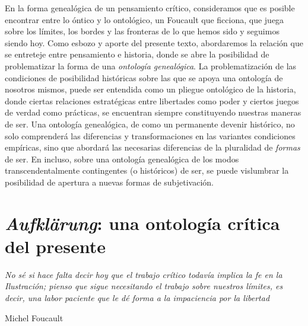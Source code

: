 En la forma genealógica de un pensamiento crítico, consideramos que es posible encontrar entre lo óntico y lo ontológico, un Foucault que ficciona, que juega sobre los límites, los bordes y las fronteras de lo que hemos sido y seguimos siendo hoy. Como esbozo y aporte del presente texto, abordaremos la relación que se entreteje entre pensamiento e historia, donde se abre la posibilidad de problematizar la forma de una \emph{ontología genealógica}. La problematización de las condiciones de posibilidad históricas sobre las que se apoya una ontología de nosotros mismos, puede ser entendida como un pliegue ontológico de la historia, donde ciertas relaciones estratégicas entre libertades como poder y ciertos juegos de verdad como prácticas, se encuentran siempre constituyendo nuestras maneras de ser. Una ontología genealógica, de como un permanente devenir histórico, no solo comprenderá las diferencias y transformaciones en las variantes condiciones empíricas, sino que abordará las necesarias diferencias de la pluralidad de \emph{formas} de ser. En incluso, sobre una ontología genealógica de los modos transcendentalmente contingentes (o históricos) de ser, se puede vislumbrar la posibilidad de apertura a nuevas formas de subjetivación.

\section{\emph{Aufklärung}: una ontología crítica del presente}


\epigraph{\emph{No sé si hace falta decir hoy que el trabajo crítico todavía implica la fe en la Ilustración; pienso que sigue necesitando el trabajo sobre nuestros límites, es decir, una labor paciente que le dé forma a la impaciencia por la libertad}}{Michel Foucault}


